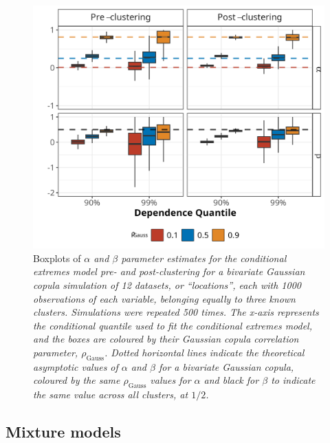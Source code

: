 \documentclass{article}
\numberwithin{equation}{section}
\begin{document}
\begin{figure}[H]
    \centering
    \includegraphics[width = 0.9\linewidth]{plots/sim_01_gauss_cop.png}
    \caption{Boxplots of \emph{$\alpha$ and $\beta$ parameter estimates for the conditional extremes model pre- and post-clustering for a bivariate Gaussian copula simulation of 12 datasets, or ``locations'', each with 1000 observations of each variable, belonging equally to three known clusters. Simulations were repeated 500 times. The x-axis represents the conditional quantile used to fit the conditional extremes model, and the boxes are coloured by their Gaussian copula correlation parameter, $\rho_{\text{Gauss}}$. Dotted horizontal lines indicate the theoretical asymptotic values of $\alpha$ and $\beta$ for a bivariate Gaussian copula, coloured by the same $\rho_{\text{Gauss}}$ values for $\alpha$ and black for $\beta$ to indicate the same value across all clusters, at $1/2$.}}
    \label{fig:00_gauss_cop}
\end{figure}


\subsection{Mixture models} \label{subsec:sim_mixture}
\end{document}
